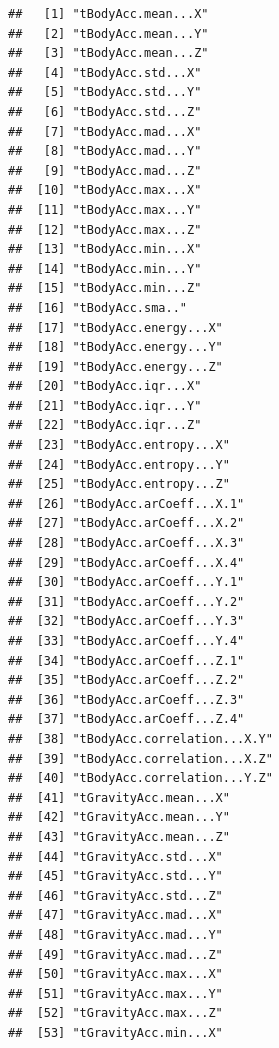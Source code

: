 \documentclass[
]{article}
\begin{document}
\begin{verbatim}
##   [1] "tBodyAcc.mean...X"                   
##   [2] "tBodyAcc.mean...Y"                   
##   [3] "tBodyAcc.mean...Z"                   
##   [4] "tBodyAcc.std...X"                    
##   [5] "tBodyAcc.std...Y"                    
##   [6] "tBodyAcc.std...Z"                    
##   [7] "tBodyAcc.mad...X"                    
##   [8] "tBodyAcc.mad...Y"                    
##   [9] "tBodyAcc.mad...Z"                    
##  [10] "tBodyAcc.max...X"                    
##  [11] "tBodyAcc.max...Y"                    
##  [12] "tBodyAcc.max...Z"                    
##  [13] "tBodyAcc.min...X"                    
##  [14] "tBodyAcc.min...Y"                    
##  [15] "tBodyAcc.min...Z"                    
##  [16] "tBodyAcc.sma.."                      
##  [17] "tBodyAcc.energy...X"                 
##  [18] "tBodyAcc.energy...Y"                 
##  [19] "tBodyAcc.energy...Z"                 
##  [20] "tBodyAcc.iqr...X"                    
##  [21] "tBodyAcc.iqr...Y"                    
##  [22] "tBodyAcc.iqr...Z"                    
##  [23] "tBodyAcc.entropy...X"                
##  [24] "tBodyAcc.entropy...Y"                
##  [25] "tBodyAcc.entropy...Z"                
##  [26] "tBodyAcc.arCoeff...X.1"              
##  [27] "tBodyAcc.arCoeff...X.2"              
##  [28] "tBodyAcc.arCoeff...X.3"              
##  [29] "tBodyAcc.arCoeff...X.4"              
##  [30] "tBodyAcc.arCoeff...Y.1"              
##  [31] "tBodyAcc.arCoeff...Y.2"              
##  [32] "tBodyAcc.arCoeff...Y.3"              
##  [33] "tBodyAcc.arCoeff...Y.4"              
##  [34] "tBodyAcc.arCoeff...Z.1"              
##  [35] "tBodyAcc.arCoeff...Z.2"              
##  [36] "tBodyAcc.arCoeff...Z.3"              
##  [37] "tBodyAcc.arCoeff...Z.4"              
##  [38] "tBodyAcc.correlation...X.Y"          
##  [39] "tBodyAcc.correlation...X.Z"          
##  [40] "tBodyAcc.correlation...Y.Z"          
##  [41] "tGravityAcc.mean...X"                
##  [42] "tGravityAcc.mean...Y"                
##  [43] "tGravityAcc.mean...Z"                
##  [44] "tGravityAcc.std...X"                 
##  [45] "tGravityAcc.std...Y"                 
##  [46] "tGravityAcc.std...Z"                 
##  [47] "tGravityAcc.mad...X"                 
##  [48] "tGravityAcc.mad...Y"                 
##  [49] "tGravityAcc.mad...Z"                 
##  [50] "tGravityAcc.max...X"                 
##  [51] "tGravityAcc.max...Y"                 
##  [52] "tGravityAcc.max...Z"                 
##  [53] "tGravityAcc.min...X"                 

\end{verbatim}
\end{document}
